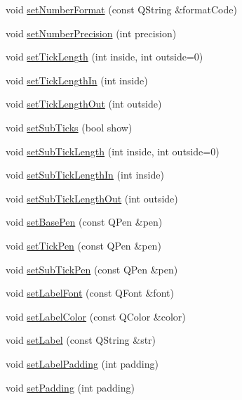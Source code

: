 \begin{DoxyCompactItemize}
\item 
void \hyperlink{class_q_c_p_axis_ae585a54dc2aac662e90a2ca82f002590}{set\+Number\+Format} (const Q\+String \&format\+Code)
\item 
void \hyperlink{class_q_c_p_axis_a21dc8023ad7500382ad9574b48137e63}{set\+Number\+Precision} (int precision)
\item 
void \hyperlink{class_q_c_p_axis_a62ec40bebe3540e9c1479a8fd2be3b0d}{set\+Tick\+Length} (int inside, int outside=0)
\item 
void \hyperlink{class_q_c_p_axis_afae1a37a99611366275a51204d991739}{set\+Tick\+Length\+In} (int inside)
\item 
void \hyperlink{class_q_c_p_axis_a3b8a0debd1ffedd2c22d0592dfbb4e62}{set\+Tick\+Length\+Out} (int outside)
\item 
void \hyperlink{class_q_c_p_axis_afa0ce8d4d0015ed23dcde01f8bc30106}{set\+Sub\+Ticks} (bool show)
\item 
void \hyperlink{class_q_c_p_axis_ab702d6fd42fc620607435339a1c2a2e1}{set\+Sub\+Tick\+Length} (int inside, int outside=0)
\item 
void \hyperlink{class_q_c_p_axis_ac46fa2a993a9f5789540977610acf1de}{set\+Sub\+Tick\+Length\+In} (int inside)
\item 
void \hyperlink{class_q_c_p_axis_a4c6dfc3963492ed72a77724012df5f23}{set\+Sub\+Tick\+Length\+Out} (int outside)
\item 
void \hyperlink{class_q_c_p_axis_a778d45fb71b3c7ab3bb7079e18b058e4}{set\+Base\+Pen} (const Q\+Pen \&pen)
\item 
void \hyperlink{class_q_c_p_axis_ad80923bcc1c5da4c4db602c5325e797e}{set\+Tick\+Pen} (const Q\+Pen \&pen)
\item 
void \hyperlink{class_q_c_p_axis_aede4028ae7516bd51a60618a8233f9cf}{set\+Sub\+Tick\+Pen} (const Q\+Pen \&pen)
\item 
void \hyperlink{class_q_c_p_axis_a71ac1a47f7547e490a8c4311d1433cf3}{set\+Label\+Font} (const Q\+Font \&font)
\item 
void \hyperlink{class_q_c_p_axis_a6c906fe56d75f0122335b9f79b999608}{set\+Label\+Color} (const Q\+Color \&color)
\item 
void \hyperlink{class_q_c_p_axis_a33bcc382c111c9f31bb0687352a2dea4}{set\+Label} (const Q\+String \&str)
\item 
void \hyperlink{class_q_c_p_axis_a4391192a766e5d20cfe5cbc17607a7a2}{set\+Label\+Padding} (int padding)
\item 
void \hyperlink{class_q_c_p_axis_a5691441cb3de9e9844855d339c0db279}{set\+Padding} (int padding)

\end{DoxyCompactItemize}
